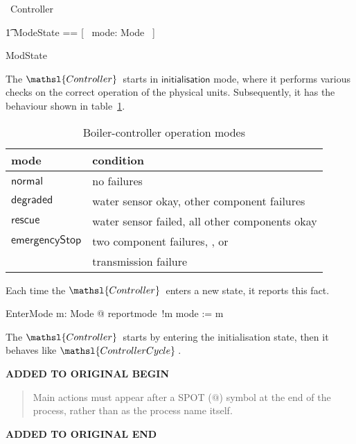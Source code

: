 \documentclass{report}
\newcommand{\true}{\ensuremath{\mathbf{true}}}
\newcommand{\event}[1]{\mathsl{#1}}
\renewcommand{\freetype}[1]{\mathsf{#1}}
\newcommand{\freetypedegraded}{\freetype{degraded}}
\newcommand{\freetypeemergencyStop }{\freetype{emergencyStop}}
\newcommand{\freetypeinitialisation}{\freetype{initialisation}}
\newcommand{\freetypenormal}{\freetype{normal}}
\newcommand{\freetyperescue}{\freetype{rescue}}
\newenvironment{addedstuff}{\begin{flushleft}\textbf{ADDED TO ORIGINAL BEGIN}\begin{quote}\begin{minipage}{.8\textwidth}}{\end{minipage}\end{quote}\textbf{ADDED TO ORIGINAL END}\end{flushleft}}
\begin{document}
\begin{circus}
   \circprocess\ Controller \circdef \circbegin
\end{circus}
\vspace{-5.3ex}
\begin{zed}
  \t1 ModeState == [~ mode: Mode ~]
\end{zed}
\begin{circusaction}
   \circstate ModState
\end{circusaction}
The \( \mathsl{Controller} \, \)\/ starts in \(
\freetypeinitialisation \)\/ mode, where it performs various checks on
the correct operation of the physical units.  Subsequently, it has the
behaviour shown in table~\ref{tab:controller-modes}.


\begin{table}[htbp]
  \begin{center}
    \bigskip %
    \begin{tabular}{l|l}
      \bfseries{mode} & \bfseries{condition}
      \\ %
      \hline %
      \( \freetypenormal \) & no failures
      \\ %
      \( \freetypedegraded \) & water sensor okay, other component failures
      \\ %
      \( \freetyperescue \) & water sensor failed, all other components okay
      \\ %
      \( \freetypeemergencyStop \) & two component failures,
      \event{emergencystop.\true}, or
      \\ %
      & transmission failure
    \end{tabular}
    \caption{Boiler-controller operation modes}
    \label{tab:controller-modes}
  \end{center}
\end{table}

Each time the \( \mathsl{Controller} \, \)\/ enters a new state, it
reports this fact.
\begin{circusaction}
    EnterMode \circdef m: Mode @ reportmode~!m \then mode := m \\
\end{circusaction}
The \( \mathsl{Controller} \, \)\/ starts by entering the
initialisation state, then it behaves like \( \mathsl{ControllerCycle}
\, \).

\begin{addedstuff}
   Main actions must appear after a SPOT ($@$) symbol at the end of the process,
   rather than as the process name itself.
\end{addedstuff}
\end{document}
